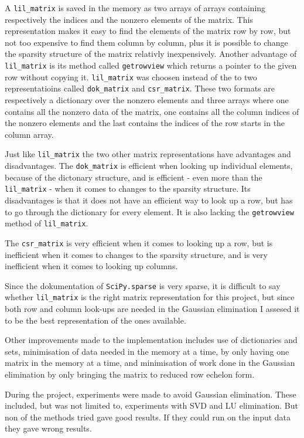 \documentclass[11pt,a4paper,twoside]{report}
\begin{document}
A \texttt{lil\_matrix} is saved in the memory as two arrays of arrays containing respectively the indices and the nonzero elements of the matrix\cite{csr}. This representation makes it easy to find the elements of the matrix row by row, but not too expensive to find them column by column, plus it is possible to change the sparsity structure of the matrix relativly inexpensively. Another advantage of \texttt{lil\_matrix} is its method called \texttt{getrowview} which returns a pointer to the given row without copying it. \texttt{lil\_matrix} was choosen instead of the to two representatioins called \texttt{dok\_matrix} and \texttt{csr\_matrix}. These two formats are respectively a dictionary over the nonzero elements\cite{wikiSparse} and three arrays where one contains all the nonzero data of the matrix, one contains all the column indices of the nonzero elements and the last contains the indices of the row starts in the column array\cite{karlrupp}.

Just like \texttt{lil\_matrix} the two other matrix representations have advantages and disadvantages. The \texttt{dok\_matrix} is efficient when looking up individual elements, because of the dictonary structure, and is efficient - even more than the \texttt{lil\_matrix} - when it comes to changes to the sparsity structure. Its disadvantages is that it does not have an efficient way to look up a row, but has to go through the dictionary for every element. It is also lacking the \texttt{getrowview} method of \texttt{lil\_matrix}\cite{dok}. 

The \texttt{csr\_matrix} is very efficient when it comes to looking up a row, but is inefficient when it comes to changes to the sparsity structure, and is very inefficient when it comes to looking up columns\cite{csr}.

Since the dokumentation of \texttt{SciPy.sparse} is very sparse, it is difficult to say whether \texttt{lil\_matrix} is the right matrix representation for this project, but since both row and column look-ups are needed in the Gaussian elimination I assesed it to be the best representation of the ones available.

Other improvements made to the implementation includes use of dictionaries and sets, minimisation of data needed in the memory at a time, by only having one matrix in the memory at a time, and minimisation of work done in the Gaussian elimination by only bringing the matrix to reduced row echelon form.

During the project, experiments were made to avoid Gaussian elimination. These included, but was not limited to, experiments with SVD and LU elimination. But non of the methods tried gave good results. If they could run on the input data they gave wrong results.
\end{document}
